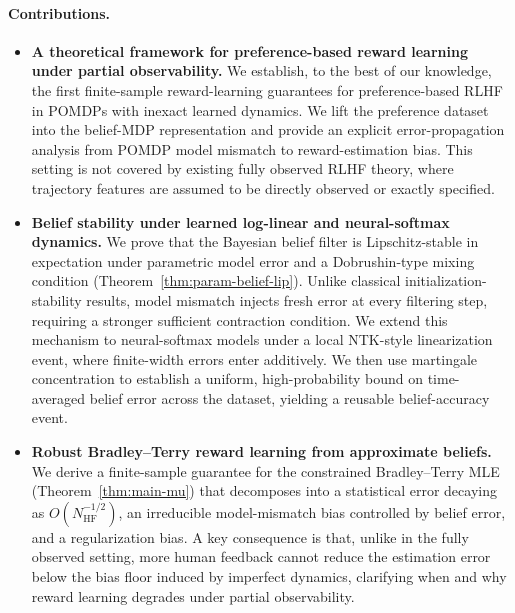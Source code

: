 \documentclass[10pt]{article} %
\theoremstyle{plain}
\theoremstyle{definition}
\theoremstyle{remark}
\begin{document}
\paragraph{Contributions.}
\begin{itemize}[leftmargin=*]
\item \textbf{A theoretical framework for preference-based reward learning under partial observability.}
We establish, to the best of our knowledge, the first finite-sample reward-learning
guarantees for preference-based RLHF in POMDPs with inexact learned dynamics. We lift
the preference dataset into the belief-MDP representation and provide an explicit
error-propagation analysis from POMDP model mismatch to reward-estimation bias. This
setting is not covered by existing fully observed RLHF theory, where trajectory
features are assumed to be directly observed or exactly specified.

\item \textbf{Belief stability under learned log-linear and neural-softmax dynamics.}
We prove that the Bayesian belief filter is Lipschitz-stable in expectation under
parametric model error and a Dobrushin-type mixing condition
(Theorem~\ref{thm:param-belief-lip}). Unlike classical initialization-stability
results, model mismatch injects fresh error at every filtering step, requiring a
stronger sufficient contraction condition. We extend this mechanism to neural-softmax
models under a local NTK-style linearization event, where finite-width errors enter
additively. We then use martingale concentration to establish a uniform,
high-probability bound on time-averaged belief error across the dataset, yielding a
reusable belief-accuracy event.

\item \textbf{Robust Bradley--Terry reward learning from approximate beliefs.}
We derive a finite-sample guarantee for the constrained Bradley--Terry MLE
(Theorem~\ref{thm:main-mu}) that decomposes into a statistical error decaying as
$O(N_{\mathrm{HF}}^{-1/2})$, an irreducible model-mismatch bias controlled by belief
error, and a regularization bias. A key consequence is that, unlike in the fully
observed setting, more human feedback cannot reduce the estimation error below the
bias floor induced by imperfect dynamics, clarifying when and why reward learning
degrades under partial observability.


\end{itemize}
\end{document}
